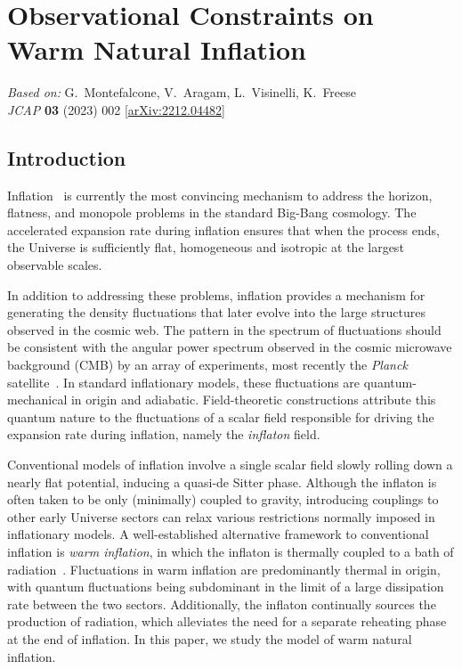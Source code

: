 \chapter{Observational Constraints on Warm Natural Inflation}
\label{ch:wi-natural}

\begin{center}
\textit{Based on:} G.~Montefalcone, V.~Aragam, L.~Visinelli, K.~Freese\\
\textit{JCAP} \textbf{03} (2023) 002
[\href{https://arxiv.org/abs/2212.04482}{arXiv:2212.04482}]
\end{center}
\vspace{1em}


\section{Introduction}
\label{sec:ch5-introduction}

Inflation~\cite{Guth:1980zm, Linde:1981mu, Albrecht:1982wi, Kazanas:1980tx, Starobinsky:1980te, Sato:1980yn, Mukhanov:1981xt, Linde:1983gd, Mukhanov:1990me} is currently the most convincing mechanism to address the horizon, flatness, and monopole problems in the standard Big-Bang cosmology. The accelerated expansion rate during inflation ensures that when the process ends, the Universe is sufficiently flat, homogeneous and isotropic at the largest observable scales.

In addition to addressing these problems, inflation provides a mechanism for generating the density fluctuations that later evolve into the large structures observed in the cosmic web. The pattern in the spectrum of fluctuations should be consistent with the angular power spectrum observed in the cosmic microwave background (CMB) by an array of experiments, most recently the {\it Planck} satellite~\cite{Planck:2018nkj}. In standard inflationary models, these fluctuations are quantum-mechanical in origin and adiabatic. Field-theoretic constructions attribute this quantum nature to the fluctuations of a scalar field responsible for driving the expansion rate during inflation, namely the {\it inflaton} field.

Conventional models of inflation involve a single scalar field slowly rolling down a nearly flat potential, inducing a quasi-de Sitter phase. Although the inflaton is often taken to be only (minimally) coupled to gravity, introducing couplings to other early Universe sectors can relax various restrictions normally imposed in inflationary models. A well-established alternative framework to conventional inflation is \textit{warm inflation}, in which the inflaton is thermally coupled to a bath of radiation~\cite{Berera:1995ie, Berera:1996fm}. Fluctuations in warm inflation are predominantly thermal in origin, with quantum fluctuations being subdominant in the limit of a large dissipation rate between the two sectors. Additionally, the inflaton continually sources the production of radiation, which alleviates the need for a separate reheating phase at the end of inflation. In this paper, we study the model of warm natural inflation.

